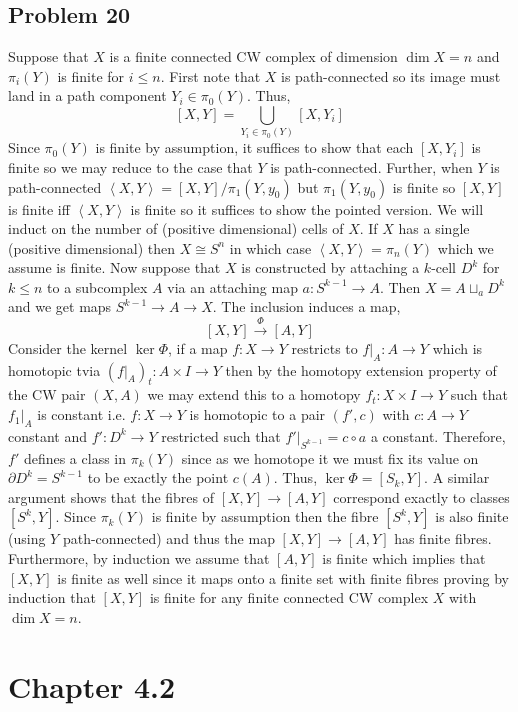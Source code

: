 \documentclass[12pt]{extarticle}
\begin{document}
\subsection{Problem 20}

Suppose that $X$ is a finite connected CW complex of dimension $\dim{X} = n$ and $\pi_i(Y)$ is finite for $i \le n$. First note that $X$ is path-connected so its image must land in a path component $Y_i \in \pi_0(Y)$. Thus,
\[ [X, Y] = \bigcup_{Y_i \in \pi_0(Y)} [X, Y_i] \]
Since $\pi_0(Y)$ is finite by assumption, it suffices to show that each $[X, Y_i]$ is finite so we may reduce to the case that $Y$ is path-connected. Further, when $Y$ is path-connected $\left< X, Y \right> = [X, Y] / \pi_1(Y, y_0)$ but $\pi_1(Y, y_0)$ is finite so $[X, Y]$ is finite iff $\left< X, Y \right>$ is finite so it suffices to show the pointed version. We will induct on the number of (positive dimensional) cells of $X$. If $X$ has a single (positive dimensional) then $X \cong S^n$ in which case $\left< X, Y \right> = \pi_n(Y)$ which we assume is finite. Now suppose that $X$ is constructed by attaching a $k$-cell  $D^k$ for $k \le n$ to a subcomplex $A$ via an attaching map $a : S^{k-1} \to A$. Then $X = A \sqcup_a D^k$ and we get maps $S^{k-1} \to A \to X$. The inclusion induces a map,
\[ [X, Y] \xrightarrow{\Phi} [A, Y] \]
Consider the kernel $\ker{\Phi}$, if a map $f: X \to Y$ restricts to $f|_A : A \to Y$ which is homotopic tvia $(f|_A)_t : A \times I \to Y$ then by the homotopy extension property of the CW pair $(X, A)$ we may extend this to a homotopy $f_t : X \times I \to Y$ such that $f_1 |_A$ is constant i.e. $f : X \to Y$ is homotopic to a pair $(f', c)$ with $c : A \to Y$ constant and $f' : D^k \to Y$ restricted such that $f'|_{S^{k-1}} = c \circ a$ a constant. Therefore, $f'$ defines a class in $\pi_k(Y)$ since as we homotope it we must fix its value on $\partial D^{k} = S^{k-1}$ to be exactly the point $c(A)$. Thus, $\ker{\Phi} = [S_k, Y]$. A similar argument shows that the fibres of $[X, Y] \to [A, Y]$ correspond exactly to classes $[S^k, Y]$. Since $\pi_k(Y)$ is finite by assumption then the fibre $[S^k, Y]$ is also finite (using $Y$ path-connected) and thus the map $[X, Y] \to [A, Y]$ has finite fibres. Furthermore, by induction we assume that $[A, Y]$ is finite which implies that $[X, Y]$ is finite as well since it maps onto a finite set with finite fibres proving by induction that $[X, Y]$ is finite for any finite connected CW complex $X$ with $\dim{X} = n$.  

\section{Chapter 4.2}
\end{document}

